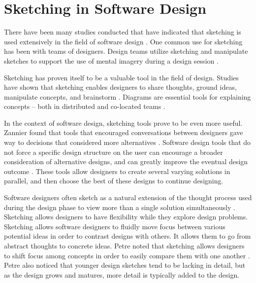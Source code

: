 \section{Sketching in Software Design}

There have been many studies conducted that have indicated that sketching is used extensively in the field of software design \cite{petre, zannier, dekel}. One common use for sketching has been with teams of designers. Design teams utilize sketching and manipulate sketches to support the use of mental imagery during a design session \cite{dekel, petre}.

Sketching has proven itself to be a valuable tool in the field of design. Studies have shown that sketching enables designers to share thoughts, ground ideas, manipulate concepts, and brainstorm \cite{cherubini}. Diagrams are essential tools for explaining concepts -- both in distributed and co-located teams \cite{yatani}.

In the context of software design, sketching tools prove to be even more useful. Zannier found that tools that encouraged conversations between designers gave way to decisions that considered more alternatives \cite{zannier}. Software design tools that do not force a specific design structure on the user can encourage a broader consideration of alternative designs, and can greatly improve the eventual design outcome \cite{zannier}. These tools allow designers to create several varying solutions in parallel, and then choose the best of these designs to continue designing. 

Software designers often sketch as a natural extension of the thought process used during the design phase to view more than a single solution simultaneously \cite{petre}. Sketching allows designers to have flexibility while they explore design problems. Sketching allows software designers to fluidly move focus between various potential ideas in order to contrast designs with others. It allows them to go from abstract thoughts to concrete ideas. Petre noted that sketching allows designers to shift focus among concepts in order to easily compare them with one another \cite{petre}. Petre also noticed that younger design sketches tend to be lacking in detail, but as the design grows and matures, more detail is typically added to the design.
